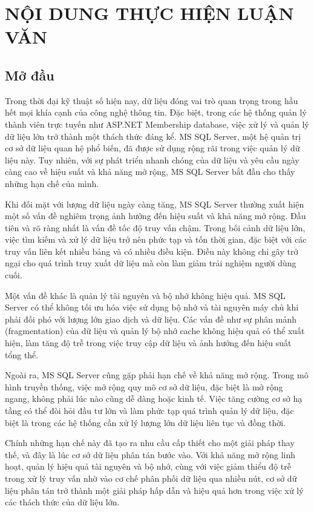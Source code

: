 \documentclass{article}[14pt]
\begin{document}
    \section{NỘI DUNG THỰC HIỆN LUẬN VĂN}
    {

    


    
\subsection{Mở đầu}
Trong thời đại kỹ thuật số hiện nay, dữ liệu đóng vai trò quan trọng trong hầu hết mọi khía cạnh của công nghệ thông tin. Đặc biệt, trong các hệ thống quản lý thành viên trực tuyến như ASP.NET Membership database, việc xử lý và quản lý dữ liệu lớn trở thành một thách thức đáng kể. MS SQL Server, một hệ quản trị cơ sở dữ liệu quan hệ phổ biến, đã được sử dụng rộng rãi trong việc quản lý dữ liệu này. Tuy nhiên, với sự phát triển nhanh chóng của dữ liệu và yêu cầu ngày càng cao về hiệu suất và khả năng mở rộng, MS SQL Server bắt đầu cho thấy những hạn chế của mình.

Khi đối mặt với lượng dữ liệu ngày càng tăng, MS SQL Server thường xuất hiện một số vấn đề nghiêm trọng ảnh hưởng đến hiệu suất và khả năng mở rộng. Đầu tiên và rõ ràng nhất là vấn đề tốc độ truy vấn chậm. Trong bối cảnh dữ liệu lớn, việc tìm kiếm và xử lý dữ liệu trở nên phức tạp và tốn thời gian, đặc biệt với các truy vấn liên kết nhiều bảng và có nhiều điều kiện. Điều này không chỉ gây trở ngại cho quá trình truy xuất dữ liệu mà còn làm giảm trải nghiệm người dùng cuối.

Một vấn đề khác là quản lý tài nguyên và bộ nhớ không hiệu quả. MS SQL Server có thể không tối ưu hóa việc sử dụng bộ nhớ và tài nguyên máy chủ khi phải đối phó với lượng lớn giao dịch và dữ liệu. Các vấn đề như sự phân mảnh (fragmentation) của dữ liệu và quản lý bộ nhớ cache không hiệu quả có thể xuất hiện, làm tăng độ trễ trong việc truy cập dữ liệu và ảnh hưởng đến hiệu suất tổng thể.

Ngoài ra, MS SQL Server cũng gặp phải hạn chế về khả năng mở rộng. Trong mô hình truyền thống, việc mở rộng quy mô cơ sở dữ liệu, đặc biệt là mở rộng ngang, không phải lúc nào cũng dễ dàng hoặc kinh tế. Việc tăng cường cơ sở hạ tầng có thể đòi hỏi đầu tư lớn và làm phức tạp quá trình quản lý dữ liệu, đặc biệt là trong các hệ thống cần xử lý lượng lớn dữ liệu liên tục và đồng thời.

Chính những hạn chế này đã tạo ra nhu cầu cấp thiết cho một giải pháp thay thế, và đây là lúc cơ sở dữ liệu phân tán bước vào. Với khả năng mở rộng linh hoạt, quản lý hiệu quả tài nguyên và bộ nhớ, cùng với việc giảm thiểu độ trễ trong xử lý truy vấn nhờ vào cơ chế phân phối dữ liệu qua nhiều nút, cơ sở dữ liệu phân tán trở thành một giải pháp hấp dẫn và hiệu quả hơn trong việc xử lý các thách thức của dữ liệu lớn.

}
\end{document}
